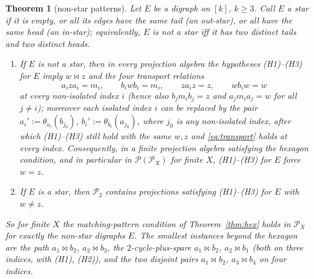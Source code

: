 \documentclass[11pt]{amsart}
\newtheorem{theorem}{Theorem}[section]
\theoremstyle{definition}
\renewcommand{\P}{\mathcal{P}}
\newcommand{\mt}{\bowtie}   %
\begin{document}
\begin{theorem}[non-star patterns]\label{prop:path}
Let $E$ be a digraph on $[k]$, $k\ge3$. Call $E$ a \emph{star} if it is empty, or all its edges have the same tail (an out-star), or all have the same head (an in-star); equivalently, $E$ is not a star iff it has two distinct tails and two distinct heads.
\begin{enumerate}[label=\textup{(\alph*)}]
\item If $E$ is not a star, then in every projection algebra the hypotheses (H1)--(H3) for $E$ imply $w\mt z$ and the four transport relations
\begin{equation}\label{eq:transport}
a_iza_i=m_i,\qquad b_iwb_i=m_i,\qquad za_iz=z,\qquad wb_iw=w
\end{equation}
at every non-isolated index $i$ (hence also $b_jm_ib_j=z$ and $a_jm_ia_j=w$ for all $j\ne i$); moreover each isolated index $i$ can be replaced by the pair $a_i':=\theta_{a_i}(b_{j_0})$, $b_i':=\theta_{b_i}(a_{j_0})$, where $j_0$ is any non-isolated index, after which (H1)--(H3) still hold with the same $w,z$ and \eqref{eq:transport} holds at every index. Consequently, in a finite projection algebra satisfying the hexagon condition, and in particular in $\P(\P_X)$ for finite $X$, (H1)--(H3) for $E$ force $w=z$.
\item If $E$ is a star, then $\P_2$ contains projections satisfying (H1)--(H3) for $E$ with $w\ne z$.
\end{enumerate}
So for finite $X$ the matching-pattern condition of Theorem~\ref{thm:hex} holds in $\P_X$ for exactly the non-star digraphs $E$. The smallest instances beyond the hexagon are the \emph{path} $a_1\mt b_2$, $a_2\mt b_3$, the \emph{$2$-cycle-plus-spare} $a_1\mt b_2$, $a_2\mt b_1$ (both on three indices, with (H1), (H2)), and the \emph{two disjoint pairs} $a_1\mt b_2$, $a_3\mt b_4$ on four indices.
\end{theorem}
\end{document}
